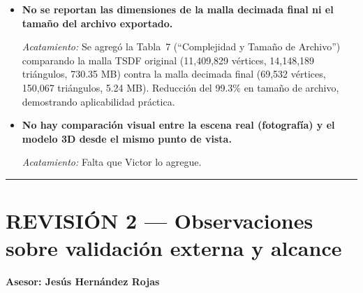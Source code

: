 \documentclass[12pt, a4paper]{article}
\begin{document}
\begin{itemize}[leftmargin=*, itemsep=1em]
\item \textbf{No se reportan las dimensiones de la malla decimada final ni el tamaño del archivo exportado.}

\textit{Acatamiento:} Se agregó la Tabla~7 (``Complejidad y Tamaño de Archivo'') comparando la malla TSDF original (11,409,829 vértices, 14,148,189 triángulos, 730.35 MB) contra la malla decimada final (69,532 vértices, 150,067 triángulos, 5.24 MB). Reducción del 99.3\% en tamaño de archivo, demostrando aplicabilidad práctica.

\item \textbf{No hay comparación visual entre la escena real (fotografía) y el modelo 3D desde el mismo punto de vista.}

\textit{Acatamiento:} Falta que Victor lo agregue.

\end{itemize}

\vspace{1em}
\hrule
\vspace{1em}


\section*{REVISIÓN 2 — Observaciones sobre validación externa y alcance}
\vspace{0.3em}
\begin{center}
\textbf{Asesor: Jesús Hernández Rojas}
\end{center}
\vspace{0.5em}
\end{document}
